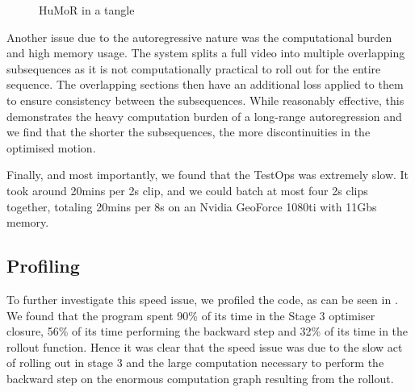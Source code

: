 \begin{figure}[!ht]
    \centering
    \hfil
    \hfil
    \caption{HuMoR in a tangle}
    \label{fig:humor_bad_mess}
\end{figure}

Another issue due to the autoregressive nature was the computational burden and high memory usage. The system splits a full video into multiple overlapping subsequences as it is not computationally practical to roll out for the entire sequence. The overlapping sections then have an additional loss applied to them to ensure consistency between the subsequences. While reasonably effective, this demonstrates the heavy computation burden of a long-range autoregression and we find that the shorter the subsequences, the more discontinuities in the optimised motion.

Finally, and most importantly, we found that the TestOps was extremely slow. It took around 20mins per 2s clip, and we could batch at most four 2s clips together, totaling 20mins per 8s on an Nvidia GeoForce 1080ti with 11Gbs memory.

\subsection{Profiling}
To further investigate this speed issue, we profiled the code, as can be seen in . We found that the program spent 90\% of its time in the Stage 3 optimiser closure, 56\% of its time performing the backward step and 32\% of its time in the rollout function. Hence it was clear that the speed issue was due to the slow act of rolling out in stage 3 and the large computation necessary to perform the backward step on the enormous computation graph resulting from the rollout.

